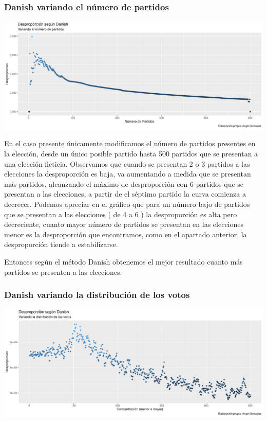 \documentclass[12pt,a4paper,]{book}
\numberwithin{dummy}{section}
\theoremstyle{ocrenumbox}
\theoremstyle{blacknumex}
\theoremstyle{blacknumbox}
\theoremstyle{ocrenum}
\theoremstyle{ocrenum}
\begin{document}
\hypertarget{danish-variando-el-nuxfamero-de-partidos}{%
\subsubsection{Danish variando el número de
partidos}\label{danish-variando-el-nuxfamero-de-partidos}}

\begin{center}\includegraphics[width=0.95\linewidth]{figurasR/unnamed-chunk-40-1} \end{center}

En el caso presente únicamente modificamos el número de partidos
presentes en la elección, desde un único posible partido hasta 500
partidos que se presentan a una elección ficticia. Observamos que cuando
se presentan 2 o 3 partidos a las elecciones la desproporción es baja,
va aumentando a medida que se presentan más partidos, alcanzando el
máximo de desproporción con 6 partidos que se presentan a las
elecciones, a partir de el séptimo partido la curva comienza a decrecer.
Podemos apreciar en el gráfico que para un número bajo de partidos que
se presentan a las elecciones ( de 4 a 6 ) la desproporción es alta pero
decreciente, cuanto mayor número de partidos se presentan en las
elecciones menor es la desproporción que encontramos, como en el
apartado anterior, la desproporción tiende a estabilizarse.

Entonces según el método Danish obtenemos el mejor resultado cuanto más
partidos se presenten a las elecciones.

\hypertarget{danish-variando-la-distribuciuxf3n-de-los-votos}{%
\subsubsection{Danish variando la distribución de los
votos}\label{danish-variando-la-distribuciuxf3n-de-los-votos}}

\begin{center}\includegraphics[width=0.95\linewidth]{figurasR/unnamed-chunk-41-1} \end{center}
\end{document}
